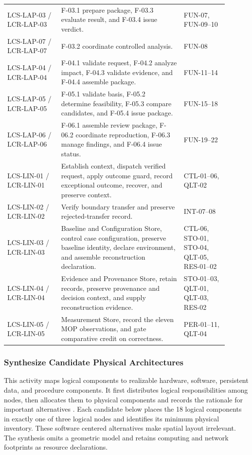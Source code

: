 \documentclass[11pt,a4paper]{article}
\begin{document}
\begin{longtable}{>{\raggedright\arraybackslash}p{0.22\linewidth} >{\raggedright\arraybackslash}p{0.50\linewidth} >{\raggedright\arraybackslash}p{0.18\linewidth}}
    LCS-LAP-03 / LCR-LAP-03 & F-03.1 prepare package, F-03.3 evaluate result, and F-03.4 issue verdict. & FUN-07, FUN-09--10 \\
    LCS-LAP-07 / LCR-LAP-07 & F-03.2 coordinate controlled analysis. & FUN-08 \\
    LCS-LAP-04 / LCR-LAP-04 & F-04.1 validate request, F-04.2 analyze impact, F-04.3 validate evidence, and F-04.4 assemble package. & FUN-11--14 \\
    LCS-LAP-05 / LCR-LAP-05 & F-05.1 validate basis, F-05.2 determine feasibility, F-05.3 compare candidates, and F-05.4 issue package. & FUN-15--18 \\
    LCS-LAP-06 / LCR-LAP-06 & F-06.1 assemble review package, F-06.2 coordinate reproduction, F-06.3 manage findings, and F-06.4 issue status. & FUN-19--22 \\
    LCS-LIN-01 / LCR-LIN-01 & Establish context, dispatch verified request, apply outcome guard, record exceptional outcome, recover, and preserve context. & CTL-01--06, QLT-02 \\
    LCS-LIN-02 / LCR-LIN-02 & Verify boundary transfer and preserve rejected-transfer record. & INT-07--08 \\
    LCS-LIN-03 / LCR-LIN-03 & Baseline and Configuration Store, control case configuration, preserve baseline identity, declare environment, and assemble reconstruction declaration. & CTL-06, STO-01, STO-04, QLT-05, RES-01--02 \\
    LCS-LIN-04 / LCR-LIN-04 & Evidence and Provenance Store, retain records, preserve provenance and decision context, and supply reconstruction evidence. & STO-01--03, QLT-01, QLT-03, RES-02 \\
    LCS-LIN-05 / LCR-LIN-05 & Measurement Store, record the eleven MOP observations, and gate comparative credit on correctness. & PER-01--11, QLT-04 \\
    \bottomrule
\end{longtable}
\normalsize

\subsubsection{Synthesize Candidate Physical Architectures}
This activity maps logical components to realizable hardware, software, persistent data, and procedure components. It first distributes logical responsibilities among nodes, then allocates them to physical components and records the rationale for important alternatives \citep[Sec.~17.3.5]{friedenthal2014practical}. Each candidate below places the 18 logical components in exactly one of three logical nodes and identifies its minimum physical inventory. These software centered alternatives make spatial layout irrelevant. The synthesis omits a geometric model and retains computing and network footprints as resource declarations.
\end{document}
